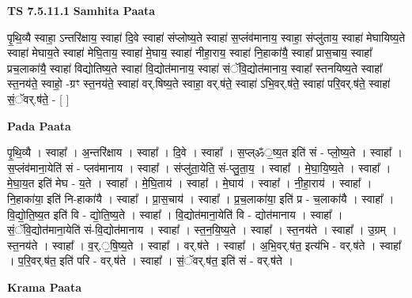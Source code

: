 \documentclass[17pt]{extarticle}
\begin{document}
\textbf{TS 7.5.11.1 } \newline
\textbf{Samhita Paata} \newline

पृ॒थि॒व्यै स्वाहा॒ ऽन्तरि॑क्षाय॒ स्वाहा॑ दि॒वे स्वाहा॑ संप्लोष्य॒ते स्वाहा॑ स॒प्लंव॑मानाय॒ स्वाहा॒ संप्लु॑ताय॒ स्वाहा॑ मेघायिष्य॒ते स्वाहा॑ मेघाय॒ते स्वाहा॑ मेघि॒ताय॒ स्वाहा॑ मे॒घाय॒ स्वाहा॑ नीहा॒राय॒ स्वाहा॑ नि॒हाका॑यै॒ स्वाहा᳚ प्रास॒चाय॒ स्वाहा᳚ प्रच॒लाका॑यै॒ स्वाहा॑ विद्योतिष्य॒ते स्वाहा॑ वि॒द्योत॑मानाय॒ स्वाहा॑ संॅवि॒द्योत॑मानाय॒ स्वाहा᳚ स्तनयिष्य॒ते स्वाहा᳚ स्त॒नय॑ते॒ स्वाहो॒ -ग्रꣳ स्त॒नय॑ते॒ स्वाहा॑ वर्.षिष्य॒ते स्वाहा॒ वर्.ष॑ते॒ स्वाहा॑ ऽभि॒वर्.ष॑ते॒ स्वाहा॑ परि॒वर्.ष॑ते॒ स्वाहा॑ सं॒ॅवर्.ष॑ते॒ - [  ] \newline

\textbf{Pada Paata} \newline

पृ॒थि॒व्यै । स्वाहा᳚ । अ॒न्तरि॑क्षाय । स्वाहा᳚ । दि॒वे । स्वाहा᳚ । स॒प्ल्ॐ॒ष्य॒त इति॑ सं - प्लो॒ष्य॒ते । स्वाहा᳚ । स॒प्लंव॑माना॒येति॑ सं - प्लव॑मानाय । स्वाहा᳚ । संप्लु॑ता॒येति॒ सं-प्लु॒ता॒य॒ । स्वाहा᳚ । मे॒घा॒यि॒ष्य॒ते । स्वाहा᳚ । मे॒घा॒य॒त इति॑ मेघ - य॒ते । स्वाहा᳚ । मे॒घि॒ताय॑ । स्वाहा᳚ । मे॒घाय॑ । स्वाहा᳚ । नी॒हा॒राय॑ । स्वाहा᳚ । नि॒हाका॑या॒ इति॑ नि-हाका॑यै । स्वाहा᳚ । प्रा॒स॒चाय॑ । स्वाहा᳚ । प्र॒च॒लाका॑या॒ इति॑ प्र - च॒लाका॑यै । स्वाहा᳚ । वि॒द्यो॒ति॒ष्य॒त इति॑ वि - द्यो॒ति॒ष्य॒ते । स्वाहा᳚ । वि॒द्योत॑माना॒येति॑ वि - द्योत॑मानाय । स्वाहा᳚ । सं॒ॅवि॒द्योत॑माना॒येति॑ सं-वि॒द्योत॑मानाय । स्वाहा᳚ । स्त॒न॒यि॒ष्य॒ते । स्वाहा᳚ । स्त॒नय॑ते । स्वाहा᳚ । उ॒ग्रम् । स्त॒नय॑ते । स्वाहा᳚ । व॒र्.॒षि॒ष्य॒ते । स्वाहा᳚ । वर्.ष॑ते । स्वाहा᳚ । अ॒भि॒वर्.ष॑त॒ इत्य॑भि - वर्.ष॑ते । स्वाहा᳚ । प॒रि॒वर्.ष॑त॒ इति॑ परि - वर्.ष॑ते । स्वाहा᳚ । सं॒ॅवर्.ष॑त॒ इति॑ सं - वर्.ष॑ते ।  \newline


\textbf{Krama Paata} \newline
\end{document}
